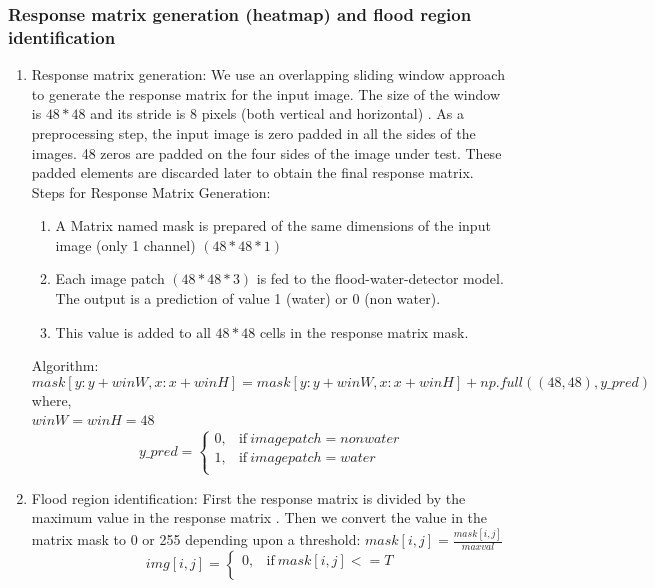 \documentclass[12pt]{article}
\begin{document}
\subsubsection{Response matrix generation (heatmap) and flood region identification}
	\begin{enumerate}
\item 	Response matrix generation: We use an overlapping sliding window approach to generate the response matrix for the input image. The size of the window is $48*48$ and its stride is 8 pixels (both vertical and horizontal) . As a preprocessing step, the input image is zero padded in all the sides of the images. 48 zeros are padded on the four sides of the image under test. These padded elements are discarded later to obtain the final response matrix.\\
Steps for Response Matrix Generation:
		\begin{enumerate}
		\item A Matrix named mask is prepared of the same dimensions of the input image (only 1 channel) $(48*48*1)$
		\item Each image patch $(48*48*3)$ is fed to the flood-water-detector model. The output is a prediction of value 1 (water) or 0 (non water).
		\item This value is added to all $48*48$  cells in the response matrix mask.
		\end{enumerate}
Algorithm:\\
$$mask[y:y + winW, x:x + winH] = mask[y:y + winW, x:x + winH]+np.full((48,48), y\_pred)$$
where,\\
$winW = winH =48$\\
	\begin{equation}
	y\_pred =
		\begin{cases}
      	0, & \text{if}\ image patch = non water \\
      	1, & \text{if}\ image patch = water \\
    	\end{cases}
	\end{equation}
\item Flood region identification: First the response matrix is divided by the maximum value in the response matrix . Then we convert the value in the matrix mask to 0 or 255 depending upon a threshold:
$\displaystyle{mask[i,j]=\frac{mask[i,j]}{maxval}}$
	\begin{equation}
	img[i,j] =
		\begin{cases}
      	0, & \text{if}\ mask[i,j] <= T \\

\end{cases}
\end{equation}
\end{enumerate}
\end{document}
